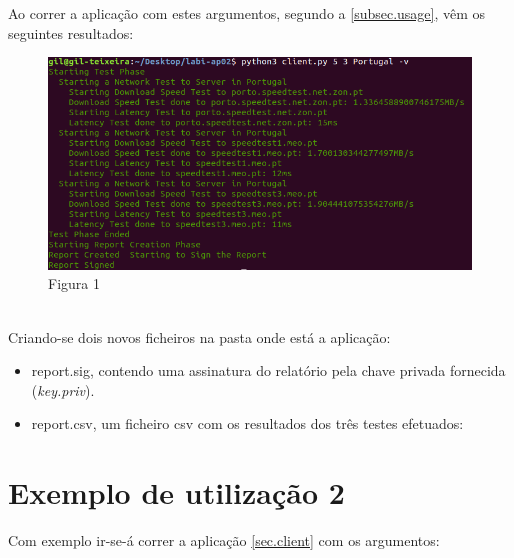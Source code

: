 \documentclass{report}
\begin{document}
Ao correr a aplicação com estes argumentos, segundo a \autoref{subsec.usage}, vêm os seguintes resultados:
\begin{figure}[h]
	\includegraphics[width=\textwidth]{useExample1}
	\caption{Figura 1}
\end{figure}
\\Criando-se dois novos ficheiros na pasta onde está a aplicação:
\begin{itemize}
\item report.sig, contendo uma assinatura do relatório pela chave privada fornecida (\textit{key.priv}).
\item report.csv, um ficheiro \ac{csv} com os resultados dos três testes efetuados:
\end{itemize}
\begin{table}[h]
\caption{Tabela 1}
\centering
{}
\end{table}

\section{Exemplo de utilização 2}
\label{sec:example2}
Com exemplo ir-se-á correr a aplicação \autoref{sec.client} com os argumentos:
\end{document}
